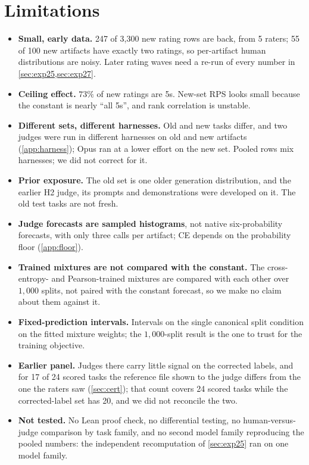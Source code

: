 \section{Limitations}
\label{sec:limits}
\begin{itemize}
\item \textbf{Small, early data.} 247 of 3{,}300 new rating rows are back, from 5 raters; 55 of 100 new artifacts have exactly two ratings, so per-artifact human distributions are noisy. Later rating waves need a re-run of every number in \cref{sec:exp25,sec:exp27}.
\item \textbf{Ceiling effect.} $73\%$ of new ratings are 5s. New-set RPS looks small because the constant is nearly ``all 5s'', and rank correlation is unstable.
\item \textbf{Different sets, different harnesses.} Old and new tasks differ, and two judges were run in different harnesses on old and new artifacts (\cref{app:harness}); Opus ran at a lower effort on the new set. Pooled rows mix harnesses; we did not correct for it.
\item \textbf{Prior exposure.} The old set is one older generation distribution, and the earlier H2 judge, its prompts and demonstrations were developed on it. The old test tasks are not fresh.
\item \textbf{Judge forecasts are sampled histograms}, not native six-probability forecasts, with only three calls per artifact; CE depends on the probability floor (\cref{app:floor}).
\item \textbf{Trained mixtures are not compared with the constant.} The cross-entropy- and Pearson-trained mixtures are compared with each other over $1{,}000$ splits, not paired with the constant forecast, so we make no claim about them against it.
\item \textbf{Fixed-prediction intervals.} Intervals on the single canonical split condition on the fitted mixture weights; the $1{,}000$-split result is the one to trust for the training objective.
\item \textbf{Earlier panel.} Judges there carry little signal on the corrected labels, and for 17 of 24 scored tasks the reference file shown to the judge differs from the one the raters saw (\cref{sec:cert}); that count covers 24 scored tasks while the corrected-label set has 20, and we did not reconcile the two.
\item \textbf{Not tested.} No Lean proof check, no differential testing, no human-versus-judge comparison by task family, and no second model family reproducing the pooled numbers: the independent recomputation of \cref{sec:exp25} ran on one model family.

\end{itemize}
